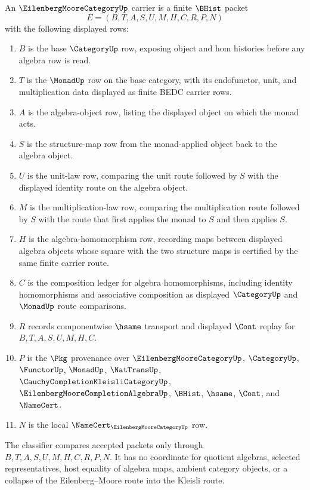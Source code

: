 \begin{definition}
\label{def:eilenberg-moore-category-carrier}
An $\EilenbergMooreCategoryUp$ carrier is a finite $\BHist$ packet
$$
E=(B,T,A,S,U,M,H,C,R,P,N)
$$
with the following displayed rows:
\begin{enumerate}
\item $B$ is the base $\CategoryUp$ row, exposing object and hom histories before any algebra row is read.
\item $T$ is the $\MonadUp$ row on the base category, with its endofunctor, unit, and multiplication data displayed as finite BEDC carrier rows.
\item $A$ is the algebra-object row, listing the displayed object on which the monad acts.
\item $S$ is the structure-map row from the monad-applied object back to the algebra object.
\item $U$ is the unit-law row, comparing the unit route followed by $S$ with the displayed identity route on the algebra object.
\item $M$ is the multiplication-law row, comparing the multiplication route followed by $S$ with the route that first applies the monad to $S$ and then applies $S$.
\item $H$ is the algebra-homomorphism row, recording maps between displayed algebra objects whose square with the two structure maps is certified by the same finite carrier route.
\item $C$ is the composition ledger for algebra homomorphisms, including identity homomorphisms and associative composition as displayed $\CategoryUp$ and $\MonadUp$ route comparisons.
\item $R$ records componentwise $\hsame$ transport and displayed $\Cont$ replay for $B,T,A,S,U,M,H,C$.
\item $P$ is the $\Pkg$ provenance over $\EilenbergMooreCategoryUp$, $\CategoryUp$, $\FunctorUp$, $\MonadUp$, $\NatTransUp$, $\CauchyCompletionKleisliCategoryUp$, $\EilenbergMooreCompletionAlgebraUp$, $\BHist$, $\hsame$, $\Cont$, and $\NameCert$.
\item $N$ is the local $\NameCert_{\EilenbergMooreCategoryUp}$ row.
\end{enumerate}
The classifier compares accepted packets only through $B,T,A,S,U,M,H,C,R,P,N$. It has no coordinate for quotient algebras, selected representatives, host equality of algebra maps, ambient category objects, or a collapse of the Eilenberg--Moore route into the Kleisli route.
\end{definition}

